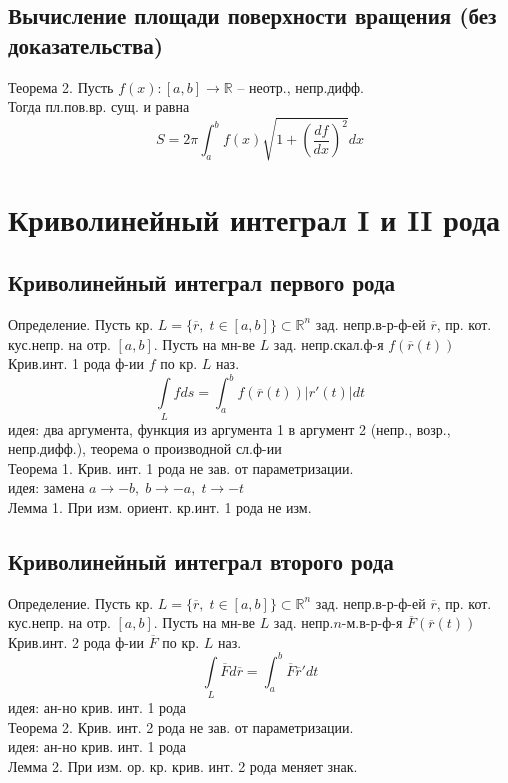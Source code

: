 \documentclass{article}
\begin{document}
\subsection{Вычисление площади поверхности вращения (без
доказательства)}
Теорема 2. Пусть $f(x): [a,b] \rightarrow \mathbb R$ -- неотр., непр.дифф. \\
Тогда пл.пов.вр. сущ. и равна
\begin{equation*}
    S = 2\pi \int_a^b f(x) \sqrt{1+(\frac{df}{dx})^2}dx
\end{equation*}


\newpage
\section{Криволинейный интеграл I и II рода}
\subsection{Криволинейный интеграл первого рода}
Определение. Пусть кр. $L = \{ \overline{r}, \; t \in [a,b] \} \subset \mathbb R^n$ зад. непр.в-р-ф-ей $\overline{r}$, пр. кот. кус.непр. на отр. $[a,b]$. Пусть на мн-ве $L$ зад. непр.скал.ф-я $f(\overline{r}(t))$ \\
Крив.инт. 1 рода ф-ии $f$ по кр. $L$ наз. \\
\begin{equation*}
    \underset{L}{\int} fds = \int_a^b f(\overline{r}(t))|r'(t)|dt
\end{equation*}
идея: два аргумента, функция из аргумента 1 в аргумент 2 (непр., возр., непр.дифф.), теорема о производной сл.ф-ии \\
Теорема 1. Крив. инт. 1 рода не зав. от параметризации. \\
идея: замена $a \rightarrow -b, \; b \rightarrow -a, \; t \rightarrow -t$ \\
Лемма 1. При изм. ориент. кр.инт. 1 рода не изм.
\subsection{Криволинейный интеграл второго рода}
Определение. Пусть кр. $L = \{ \overline{r}, \; t \in [a,b] \} \subset \mathbb R^n$ зад. непр.в-р-ф-ей $\overline{r}$, пр. кот. кус.непр. на отр. $[a,b]$. Пусть на мн-ве $L$ зад. непр.$n$-м.в-р-ф-я $\overline{F}(\overline{r}(t))$ \\
Крив.инт. 2 рода ф-ии $\overline F$ по кр. $L$ наз. \\
\begin{equation*}
    \underset{L}{\int} \overline F d \overline r = \int_a^b \overline F \overline r' dt
\end{equation*}
идея: ан-но крив. инт. 1 рода \\
Теорема 2. Крив. инт. 2 рода не зав. от параметризации. \\
идея: ан-но крив. инт. 1 рода \\
Лемма 2. При изм. ор. кр. крив. инт. 2 рода меняет знак.
\end{document}
